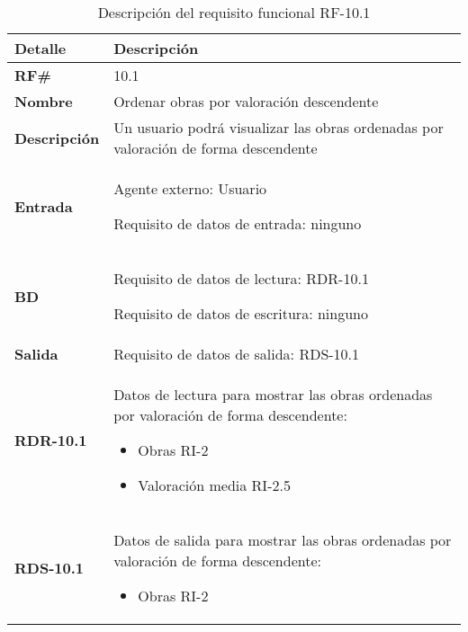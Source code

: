 \begin{table}[H]
    \centering
    \begin{tabular}{|p{3cm}|p{8cm}|}
        \hline
        \rowcolor{lightgray}
        \textbf{Detalle} & \textbf{Descripción} \\
        \hline
        \textbf{RF\#} & 10.1 \\
        \hline
        \textbf{Nombre} & Ordenar obras por valoración descendente \\
        \hline
        \textbf{Descripción} & Un usuario podrá visualizar las obras ordenadas
        por valoración de forma descendente \\
        \hline
        \textbf{Entrada} &
        Agente externo: Usuario
        
        Requisito de datos de entrada: ninguno \\
        \hline
        \textbf{BD} &
        Requisito de datos de lectura: RDR-10.1
        
        Requisito de datos de escritura: ninguno \\
        \hline
        \textbf{Salida} & Requisito de datos de salida: RDS-10.1 \\
        \hline
        \textbf{RDR-10.1} & Datos de lectura para mostrar las obras ordenadas por valoración
        de forma descendente:
            \begin{itemize}
                \item Obras RI-2
                \item Valoración media RI-2.5
            \end{itemize} \\
        \hline
        \textbf{RDS-10.1} & Datos de salida para mostrar las obras ordenadas por valoración
        de forma descendente:
            \begin{itemize}
                \item Obras RI-2
            \end{itemize} \\
        \hline
    \end{tabular}
    \caption{Descripción del requisito funcional RF-10.1}
    \label{tab:rf-10-1}
\end{table}

